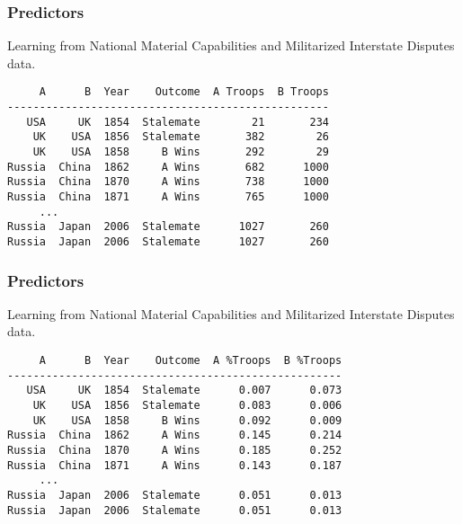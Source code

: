 \documentclass[10pt]{beamer}
\begin{document}
\begin{frame}[fragile]
  \frametitle{Predictors}

  Learning from National Material Capabilities and Militarized Interstate Disputes data.

\begin{small}
\begin{verbatim}
     A      B  Year    Outcome  A Troops  B Troops
--------------------------------------------------
   USA     UK  1854  Stalemate        21       234
    UK    USA  1856  Stalemate       382        26
    UK    USA  1858     B Wins       292        29
Russia  China  1862     A Wins       682      1000
Russia  China  1870     A Wins       738      1000
Russia  China  1871     A Wins       765      1000
     ...
Russia  Japan  2006  Stalemate      1027       260
Russia  Japan  2006  Stalemate      1027       260
\end{verbatim}
\end{small}

\end{frame}

\begin{frame}[fragile]
  \frametitle{Predictors}

  Learning from National Material Capabilities and Militarized Interstate Disputes data.

\begin{small}
\begin{verbatim}
     A      B  Year    Outcome  A %Troops  B %Troops
----------------------------------------------------
   USA     UK  1854  Stalemate      0.007      0.073
    UK    USA  1856  Stalemate      0.083      0.006
    UK    USA  1858     B Wins      0.092      0.009
Russia  China  1862     A Wins      0.145      0.214
Russia  China  1870     A Wins      0.185      0.252
Russia  China  1871     A Wins      0.143      0.187
     ...
Russia  Japan  2006  Stalemate      0.051      0.013
Russia  Japan  2006  Stalemate      0.051      0.013
\end{verbatim}
\end{small}

\end{frame}
\end{document}
